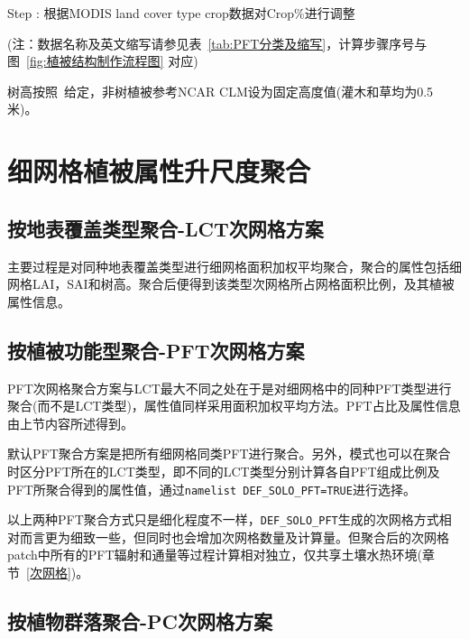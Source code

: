 Step : 根据MODIS land cover type crop数据对Crop\%进行调整

(注：数据名称及英文缩写请参见表~\ref{tab:PFT分类及缩写}，计算步骤序号与图~\ref{fig:植被结构制作流程图} 对应)

树高按照~\citet{simard2011mapping}给定，非树植被参考NCAR CLM设为固定高度值(灌木和草均为0.5米)。


\section{细网格植被属性升尺度聚合}\label{sec:次网格聚合}
\subsection{按地表覆盖类型聚合-LCT次网格方案}

主要过程是对同种地表覆盖类型进行细网格面积加权平均聚合，聚合的属性包括细网格LAI，SAI和树高。聚合后便得到该类型次网格所占网格面积比例，及其植被属性信息。

\subsection{按植被功能型聚合-PFT次网格方案}

PFT次网格聚合方案与LCT最大不同之处在于是对细网格中的同种PFT类型进行聚合(而不是LCT类型)，属性值同样采用面积加权平均方法。PFT占比及属性信息由上节内容所述得到。

默认PFT聚合方案是把所有细网格同类PFT进行聚合。另外，模式也可以在聚合时区分PFT所在的LCT类型，即不同的LCT类型分别计算各自PFT组成比例及PFT所聚合得到的属性值，通过\texttt{namelist DEF\_SOLO\_PFT=TRUE}进行选择。

以上两种PFT聚合方式只是细化程度不一样，\texttt{DEF\_SOLO\_PFT}生成的次网格方式相对而言更为细致一些，但同时也会增加次网格数量及计算量。但聚合后的次网格patch中所有的PFT辐射和通量等过程计算相对独立，仅共享土壤水热环境(章节~\ref{次网格})。 


\subsection{按植物群落聚合-PC次网格方案}

